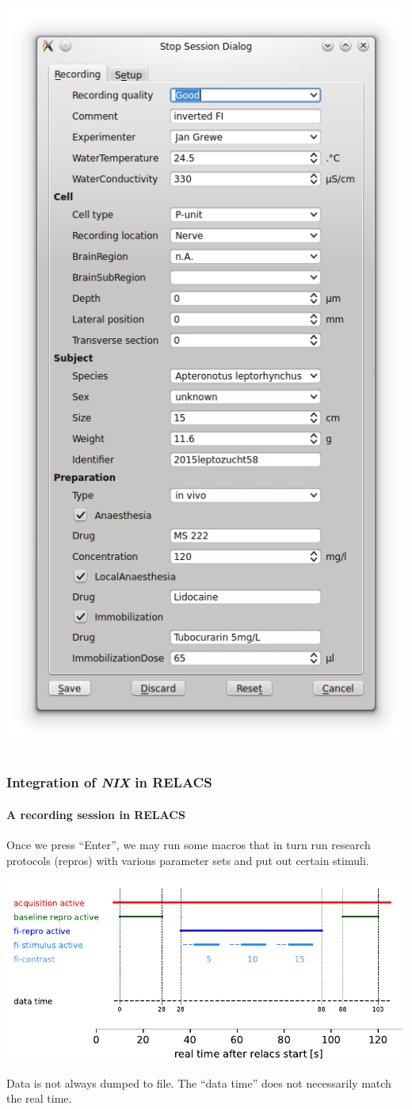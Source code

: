 \documentclass[pdftex, xcolor=table]{beamer}
\newcommand{\nix}{\textit{NIX}}
\begin{document}
\begin{frame}
\begin{columns}
\begin{column}{6cm}
      \includegraphics[width=0.7\columnwidth]{images/relacs_ephys_mdata}
    \end{column}
  \end{columns}
\end{frame}


\begin{frame}
  \frametitle{Integration of \nix{} in RELACS}
  \framesubtitle{A recording session in RELACS}

  Once we press ``Enter'', we may run some macros that in turn run
  research protocols (repros) with various parameter sets and put out
  certain stimuli.

  \begin{center}
    \includegraphics[width=0.9\columnwidth]{images/relacs_timeline}
  \end{center}

  Data is not always dumped to file. The ``data time'' does not
  necessarily match the real time.
\end{frame}
\end{document}
